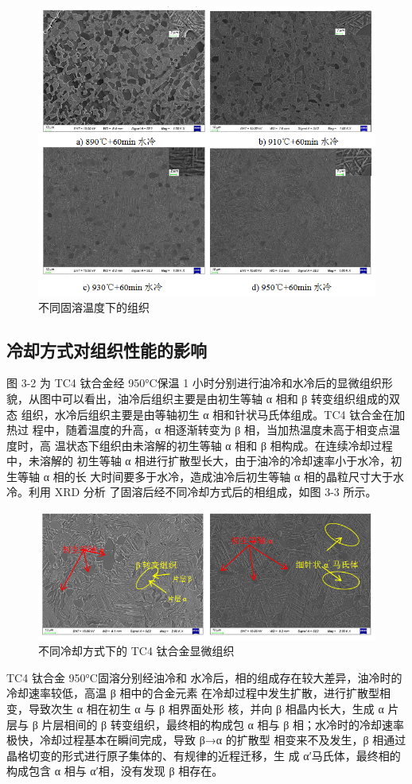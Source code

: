 \begin{figure}[h!]
	\centering
	\includegraphics[width=0.7\linewidth]{pic/demo-不同固溶温度的影响}
	\caption{不同固溶温度下的组织}
	\label{fig:demo-}
\end{figure}


\subsection{冷却方式对组织性能的影响}
图 3-2 为 TC4 钛合金经 950°C保温 1 小时分别进行油冷和水冷后的显微组织形 貌，从图中可以看出，油冷后组织主要是由初生等轴 α 相和 β 转变组织组成的双态 组织，水冷后组织主要是由等轴初生 α 相和针状马氏体组成。TC4 钛合金在加热过 程中，随着温度的升高，α 相逐渐转变为 β 相，当加热温度未高于相变点温度时，高 温状态下组织由未溶解的初生等轴 α 相和 β 相构成。在连续冷却过程中，未溶解的 初生等轴 α 相进行扩散型长大，由于油冷的冷却速率小于水冷，初生等轴 α 相的长 大时间要多于水冷，造成油冷后初生等轴 α 相的晶粒尺寸大于水冷。利用 XRD 分析 了固溶后经不同冷却方式后的相组成，如图 3-3 所示。

\begin{figure}[h!]
	\centering
	\includegraphics[width=0.7\linewidth]{pic/demo-油冷与水冷的对比}
	\caption{不同冷却方式下的 TC4 钛合金显微组织}
	\label{fig:demo-油冷与水冷}
\end{figure}

TC4 钛合金 950°C固溶分别经油冷和 水冷后，相的组成存在较大差异，油冷时的冷却速率较低，高温 β 相中的合金元素 在冷却过程中发生扩散，进行扩散型相变，导致次生 α 相在初生 α 与 β 相界面处形 核，并向 β 相晶内长大，生成 α 片层与 β 片层相间的 β 转变组织，最终相的构成包 α 相与 β 相；水冷时的冷却速率极快，冷却过程基本在瞬间完成，导致 β→α 的扩散型 相变来不及发生，β 相通过晶格切变的形式进行原子集体的、有规律的近程迁移，生 成 α′马氏体，最终相的构成包含 α 相与 α′相，没有发现 β 相存在。


